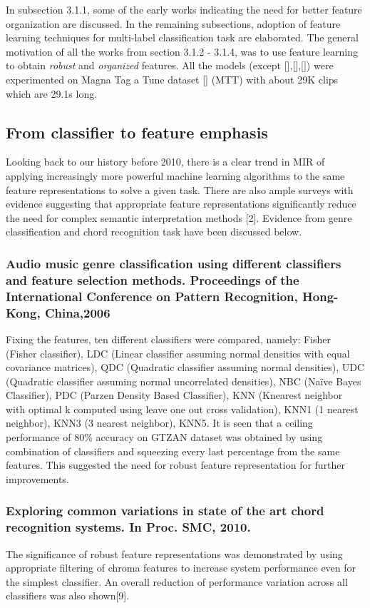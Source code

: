 \noindent In subsection 3.1.1, some of the early works indicating the need for better feature organization are discussed. In the remaining subsections, adoption of feature learning techniques for multi-label classification task are elaborated. The general motivation of all the works from section 3.1.2 - 3.1.4, was to use feature learning to obtain \textit{robust} and \textit{organized} features. All the models (except [],[],[]) were experimented on Magna Tag a Tune dataset [] (MTT) with about 29K clips which are 29.1s long.


\subsection{From classifier to feature emphasis}
Looking back to our history before 2010, there is a clear trend in MIR of applying increasingly more powerful machine learning algorithms to the same feature representations to solve a given task. There are also ample surveys with evidence suggesting that appropriate feature representations significantly reduce the need for complex semantic interpretation methods [2]. Evidence from genre classification and chord recognition task have been discussed below. 

\subsubsection{Audio music genre classification using different classifiers and feature selection methods. Proceedings of the International Conference on Pattern Recognition, Hong-Kong, China,2006}
Fixing the features, ten different classifiers were compared, namely: Fisher (Fisher classifier), LDC (Linear classifier assuming normal densities with equal covariance matrices), QDC (Quadratic classifier assuming normal densities), UDC (Quadratic classifier assuming normal uncorrelated densities), NBC (Naïve Bayes Classifier), PDC (Parzen Density Based Classifier), KNN (Knearest neighbor with optimal k computed using leave one out cross validation), KNN1 (1 nearest neighbor), KNN3 (3 nearest neighbor), KNN5.  It is seen that a ceiling performance of 80\% accuracy on GTZAN dataset was obtained by using combination of classifiers and squeezing every last percentage from the same features. This suggested the need for robust feature representation for further improvements.

\subsubsection{Exploring common variations in state of the art chord recognition systems. In Proc. SMC, 2010.}
The significance of robust feature representations was demonstrated by using appropriate filtering of chroma features to increase system performance even for the simplest classifier. An overall reduction of performance variation across all classifiers was also shown[9].

